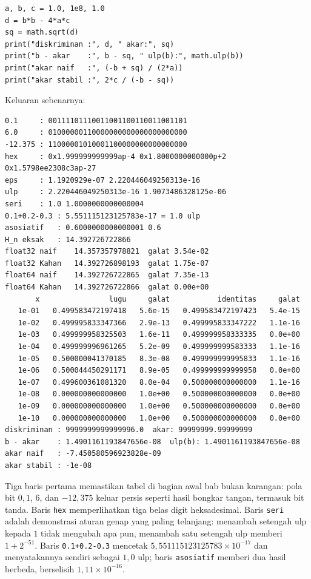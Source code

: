 \begin{lab}
\begin{verbatim}
a, b, c = 1.0, 1e8, 1.0
d = b*b - 4*a*c
sq = math.sqrt(d)
print("diskriminan :", d, " akar:", sq)
print("b - akar    :", b - sq, " ulp(b):", math.ulp(b))
print("akar naif   :", (-b + sq) / (2*a))
print("akar stabil :", 2*c / (-b - sq))
\end{verbatim}
Keluaran sebenarnya:
\begin{verbatim}
0.1     : 00111101110011001100110011001101
6.0     : 01000000110000000000000000000000
-12.375 : 11000001010001100000000000000000
hex     : 0x1.999999999999ap-4 0x1.8000000000000p+2 0x1.5798ee2308c3ap-27
eps     : 1.1920929e-07 2.220446049250313e-16
ulp     : 2.220446049250313e-16 1.9073486328125e-06
seri    : 1.0 1.0000000000000004
0.1+0.2-0.3 : 5.551115123125783e-17 = 1.0 ulp
asosiatif   : 0.6000000000000001 0.6
H_n eksak   : 14.392726722866
float32 naif    14.357357978821  galat 3.54e-02
float32 Kahan   14.392726898193  galat 1.75e-07
float64 naif    14.392726722865  galat 7.35e-13
float64 Kahan   14.392726722866  galat 0.00e+00
       x                lugu     galat           identitas     galat
   1e-01   0.499583472197418   5.6e-15   0.499583472197423   5.4e-15
   1e-02   0.499995833347366   2.9e-13   0.499995833347222   1.1e-16
   1e-03   0.499999958325503   1.6e-11   0.499999958333335   0.0e+00
   1e-04   0.499999996961265   5.2e-09   0.499999999583333   1.1e-16
   1e-05   0.500000041370185   8.3e-08   0.499999999995833   1.1e-16
   1e-06   0.500044450291171   8.9e-05   0.499999999999958   0.0e+00
   1e-07   0.499600361081320   8.0e-04   0.500000000000000   1.1e-16
   1e-08   0.000000000000000   1.0e+00   0.500000000000000   0.0e+00
   1e-09   0.000000000000000   1.0e+00   0.500000000000000   0.0e+00
   1e-10   0.000000000000000   1.0e+00   0.500000000000000   0.0e+00
diskriminan : 9999999999999996.0  akar: 99999999.99999999
b - akar    : 1.4901161193847656e-08  ulp(b): 1.4901161193847656e-08
akar naif   : -7.450580596923828e-09
akar stabil : -1e-08
\end{verbatim}
\end{lab}

Tiga baris pertama memastikan tabel di bagian awal bab bukan karangan: pola bit
$0{,}1$, $6$, dan $-12{,}375$ keluar persis seperti hasil bongkar tangan, termasuk bit
tanda. Baris \texttt{hex} memperlihatkan tiga belas digit heksadesimal. Baris
\texttt{seri} adalah demonstrasi aturan genap yang paling telanjang: menambah
setengah ulp kepada $1$ tidak mengubah apa pun, menambah satu setengah ulp memberi
$1+2^{-51}$. Baris \texttt{0.1+0.2-0.3} mencetak
$5{,}551115123125783\times10^{-17}$ dan menyatakannya sendiri sebagai $1{,}0$ ulp;
baris \texttt{asosiatif} memberi dua hasil berbeda, berselisih
$1{,}11\times10^{-16}$.

